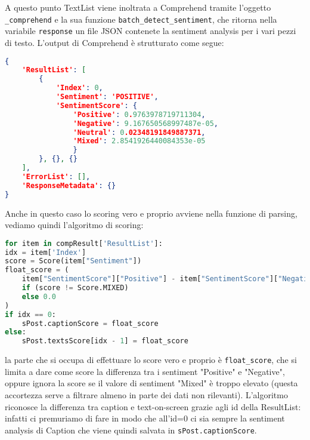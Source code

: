 A questo punto TextList viene inoltrata a Comprehend tramite l'oggetto \verb+_comprehend+ e la sua
funzione \verb+batch_detect_sentiment+, che ritorna nella variabile \verb+response+ un file JSON
contenete la sentiment analysis per i vari pezzi di testo. 
L'output di Comprehend è strutturato come segue:
\begin{lstlisting}[language=JSON]
{
    'ResultList': [
        {
            'Index': 0, 
            'Sentiment': 'POSITIVE', 
            'SentimentScore': {
                'Positive': 0.9763978719711304, 
                'Negative': 9.167650568997487e-05, 
                'Neutral': 0.02348191849887371, 
                'Mixed': 2.8541926440084353e-05
                }
        }, {}, {}
    ], 
    'ErrorList': [], 
    'ResponseMetadata': {}
}
\end{lstlisting}
Anche in questo caso lo scoring vero e proprio avviene nella funzione di parsing, vediamo quindi
l'algoritmo di scoring:
\begin{lstlisting}[language=Python]
for item in compResult['ResultList']:
idx = item['Index']
score = Score(item["Sentiment"])
float_score = (
    item["SentimentScore"]["Positive"] - item["SentimentScore"]["Negative"]
    if (score != Score.MIXED)
    else 0.0
)
if idx == 0:
    sPost.captionScore = float_score
else:
    sPost.textsScore[idx - 1] = float_score
\end{lstlisting}
la parte che si occupa di effettuare lo score vero e proprio è \verb+float_score+, che si limita
a dare come score la differenza tra i sentiment "Positive" e "Negative", oppure ignora la score se 
il valore di sentiment "Mixed" è troppo elevato (questa accortezza serve a filtrare almeno in parte
dei dati non rilevanti).
L'algoritmo riconosce la differenza tra caption e text-on-screen grazie agli id
della ResultList: infatti ci premuriamo di fare in modo che all'id=0 ci sia sempre la sentiment 
analysis di Caption che viene quindi salvata in \verb+sPost.captionScore+.

